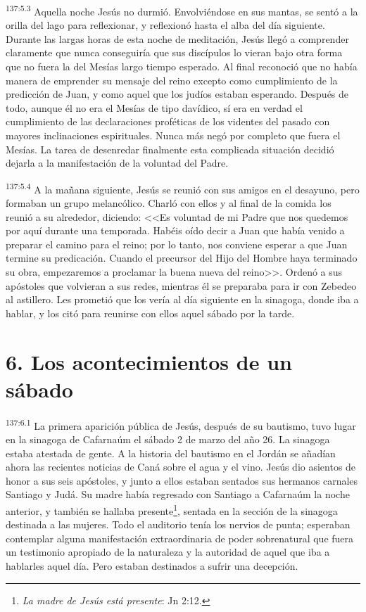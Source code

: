 \par 
\textsuperscript{137:5.3} Aquella noche Jesús no durmió. Envolviéndose en sus mantas, se sentó a la orilla del lago para reflexionar, y reflexionó hasta el alba del día siguiente. Durante las largas horas de esta noche de meditación, Jesús llegó a comprender claramente que nunca conseguiría que sus discípulos lo vieran bajo otra forma que no fuera la del Mesías largo tiempo esperado. Al final reconoció que no había manera de emprender su mensaje del reino excepto como cumplimiento de la predicción de Juan, y como aquel que los judíos estaban esperando. Después de todo, aunque él no era el Mesías de tipo davídico, sí era en verdad el cumplimiento de las declaraciones proféticas de los videntes del pasado con mayores inclinaciones espirituales. Nunca más negó por completo que fuera el Mesías. La tarea de desenredar finalmente esta complicada situación decidió dejarla a la manifestación de la voluntad del Padre.

\par 
\textsuperscript{137:5.4} A la mañana siguiente, Jesús se reunió con sus amigos en el desayuno, pero formaban un grupo melancólico. Charló con ellos y al final de la comida los reunió a su alrededor, diciendo: <<Es voluntad de mi Padre que nos quedemos por aquí durante una temporada. Habéis oído decir a Juan que había venido a preparar el camino para el reino; por lo tanto, nos conviene esperar a que Juan termine su predicación. Cuando el precursor del Hijo del Hombre haya terminado su obra, empezaremos a proclamar la buena nueva del reino>>. Ordenó a sus apóstoles que volvieran a sus redes, mientras él se preparaba para ir con Zebedeo al astillero. Les prometió que los vería al día siguiente en la sinagoga, donde iba a hablar, y los citó para reunirse con ellos aquel sábado por la tarde.

\section*{6. Los acontecimientos de un sábado}
\par 
\textsuperscript{137:6.1} La primera aparición pública de Jesús, después de su bautismo, tuvo lugar en la sinagoga de Cafarnaúm el sábado 2 de marzo del año 26. La sinagoga estaba atestada de gente. A la historia del bautismo en el Jordán se añadían ahora las recientes noticias de Caná sobre el agua y el vino. Jesús dio asientos de honor a sus seis apóstoles, y junto a ellos estaban sentados sus hermanos carnales Santiago y Judá. Su madre había regresado con Santiago a Cafarnaúm la noche anterior, y también se hallaba presente\footnote{\textit{La madre de Jesús está presente}: Jn 2:12.}, sentada en la sección de la sinagoga destinada a las mujeres. Todo el auditorio tenía los nervios de punta; esperaban contemplar alguna manifestación extraordinaria de poder sobrenatural que fuera un testimonio apropiado de la naturaleza y la autoridad de aquel que iba a hablarles aquel día. Pero estaban destinados a sufrir una decepción.

